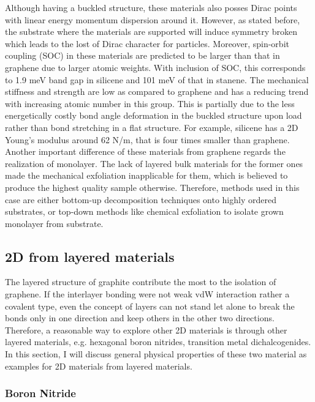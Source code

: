 Although having a buckled structure, these materials also posses Dirac points with linear energy momentum dispersion around it\cite{Garcia2011}.  However, as stated before, the substrate where the materials are supported will induce symmetry broken which leads to the lost of Dirac character for particles\cite{Lin2013}. Moreover, spin-orbit coupling (SOC) in these materials are predicted to be larger than that in graphene due to larger atomic weights. With inclusion of SOC, this corresponds to 1.9 meV band gap in silicene  and 101 meV of that in stanene\cite{matthes2013}. The mechanical stiffness and strength are low as compared to graphene and has a reducing trend with increasing atomic number in this group. This is partially due to the less energetically costly bond angle deformation in the buckled structure upon load rather than bond stretching in a flat structure\cite{Manjanath2014}. For example, silicene has a 2D Young's modulus around 62 \si{N/m}, that is four times smaller than graphene. Another important difference of these materials from graphene regards the realization of monolayer. The lack of layered bulk materials for the former ones made the mechanical exfoliation inapplicable for them, which is believed to produce the highest quality sample otherwise. Therefore, methods used in this case are either bottom-up decomposition techniques onto highly ordered substrates\cite{vogt2012,li2014}, or top-down methods like chemical exfoliation to isolate grown monolayer from substrate\cite{lin2012,kaloni2013}.


\subsection{2D from layered materials}

The layered structure of graphite contribute the most to the isolation of graphene. If the interlayer bonding were not weak vdW interaction rather a covalent type, even the concept of layers can not stand let alone to break the bonds only in one direction and keep others in the other two directions. Therefore, a reasonable way to explore other 2D materials is through other layered materials, e.g. hexagonal boron nitrides, transition metal dichalcogenides. In this section, I will discuss general physical properties of these two material as examples for 2D materials from layered materials.

\subsubsection{Boron Nitride}

